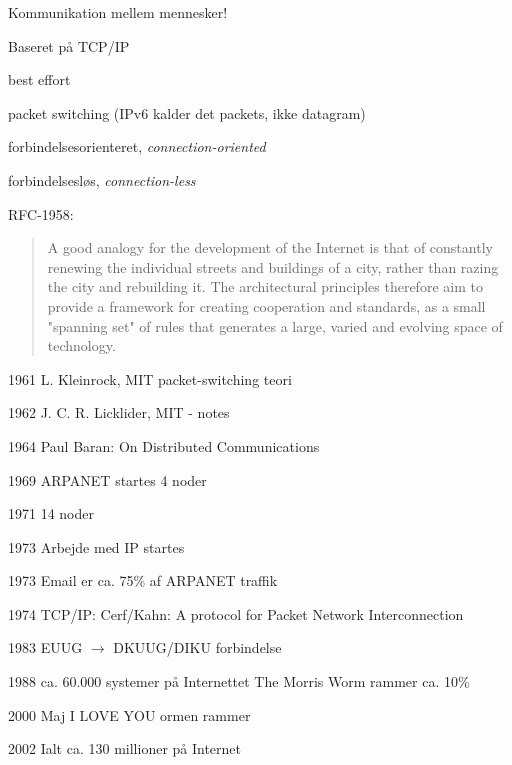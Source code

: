 \documentclass[Screen16to9,17pt]{foils}
\begin{document}

\begin{list1}
\item Kommunikation mellem mennesker!
\item Baseret på TCP/IP
\begin{list2}
\item best effort
\item packet switching (IPv6 kalder det packets, ikke datagram)
\item forbindelsesorienteret, \emph{connection-oriented}
\item forbindelsesløs, \emph{connection-less}
\end{list2}
\end{list1}

RFC-1958:
\begin{quote}
 A good analogy for the development of the Internet is that of
 constantly renewing the individual streets and buildings of a city,
 rather than razing the city and rebuilding it. The architectural
 principles therefore aim to provide a framework for creating
 cooperation and standards, as a small "spanning set" of rules that
 generates a large, varied and evolving space of technology.
\end{quote}


\begin{list2}
\item[1961]  L. Kleinrock, MIT packet-switching teori
\item[1962]  J. C. R. Licklider, MIT - notes
\item[1964]  Paul Baran: On Distributed Communications
\item[1969]  ARPANET startes 4 noder
\item[1971]  14 noder
\item[1973]  Arbejde med IP startes
\item[1973]  Email er ca. 75\% af ARPANET traffik
\item[1974]  TCP/IP: Cerf/Kahn: A protocol for Packet
        Network Interconnection
\item[1983]  EUUG $\rightarrow$ DKUUG/DIKU forbindelse
\item[1988]  ca. 60.000 systemer på Internettet
        The Morris Worm rammer ca. 10\%
\item[2000]  Maj I LOVE YOU ormen rammer
\item[2002]  Ialt ca. 130 millioner på Internet
\end{list2}
\end{document}
